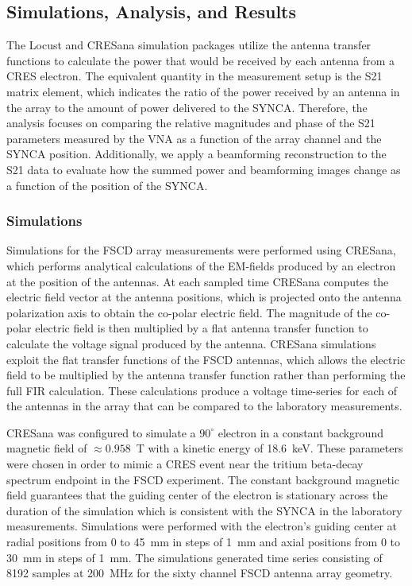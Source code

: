 \subsection{Simulations, Analysis, and Results}

The Locust and CRESana simulation packages utilize the antenna transfer functions to calculate the power that would be received by each antenna from a CRES electron. The equivalent quantity in the measurement setup is the S21 matrix element, which indicates the ratio of the power received by an antenna in the array to the amount of power delivered to the SYNCA. Therefore, the analysis focuses on comparing the relative magnitudes and phase of the S21 parameters measured by the VNA as a function of the array channel and the SYNCA position. Additionally, we apply a beamforming reconstruction to the S21 data to evaluate how the summed power and beamforming images change as a function of the position of the SYNCA.

\subsubsection{Simulations}

Simulations for the FSCD array measurements were performed using CRESana, which performs analytical calculations of the EM-fields produced by an electron at the position of the antennas. At each sampled time CRESana computes the electric field vector at the antenna positions, which is projected onto the antenna polarization axis to obtain the co-polar electric field. The magnitude of the co-polar electric field is then multiplied by a flat antenna transfer function to calculate the voltage signal produced by the antenna. CRESana simulations exploit the flat transfer functions of the FSCD antennas, which allows the electric field to be multiplied by the antenna transfer function rather than performing the full FIR calculation. These calculations produce a voltage time-series for each of the antennas in the array that can be compared to the laboratory measurements.

CRESana was configured to simulate a $90^\circ$ electron in a constant background magnetic field of $\approx0.958$~T with a kinetic energy of 18.6~keV. These parameters were chosen in order to mimic a CRES event near the tritium beta-decay spectrum endpoint in the FSCD experiment. The constant background magnetic field guarantees that the guiding center of the electron is stationary across the duration of the simulation which is consistent with the SYNCA in the laboratory measurements. Simulations were performed with the electron's guiding center at radial positions from 0 to 45~mm in steps of 1~mm and axial positions from 0 to 30~mm in steps of 1~mm. The simulations generated time series consisting of 
8192 samples at 200~MHz for the sixty channel FSCD antenna array geometry.

